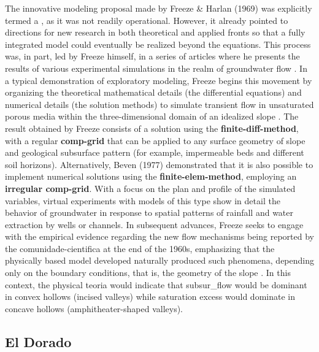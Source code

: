 \documentclass[./main_en.tex]{subfiles}
\begin{document}
\par The innovative modeling proposal made by Freeze \& Harlan (1969) was explicitly termed a , as it was not readily operational. However, it already pointed to directions for new research in both theoretical and applied fronts so that a fully integrated \gls{model} could eventually be realized beyond the equations. This process was, in part, led by Freeze himself, in a series of articles where he presents the results of various experimental simulations in the realm of groundwater flow \cite{Freeze1974a}. In a typical demonstration of exploratory modeling, Freeze begins this movement by organizing the theoretical mathematical details (the differential equations) and numerical details (the solution methods) to simulate transient flow in unsaturated porous media within the three-dimensional domain of an idealized slope \cite{Freeze1971a}. The result obtained by Freeze consists of a solution using the \textbf{\gls{finite-diff-method}}, with a regular \textbf{\gls{comp-grid}} that can be applied to any surface geometry of slope and geological subsurface pattern (for example, impermeable beds and different soil horizons). Alternatively, Beven (1977) \cite{Beven1977a} demonstrated that it is also possible to implement numerical solutions using the \textbf{\gls{finite-elem-method}}, employing an \textbf{irregular \gls{comp-grid}}. With a focus on the plan and profile of the simulated variables, virtual experiments with models of this type show in detail the behavior of groundwater in response to spatial patterns of rainfall and water extraction by wells or channels. In subsequent advances, Freeze seeks to engage with the empirical evidence regarding the new flow mechanisms being reported by the \gls{comunidade-cientifica} at the end of the 1960s, emphasizing that the physically based \gls{model} developed naturally produced such phenomena, depending only on the boundary conditions, that is, the geometry of the slope \cite{Freeze1972a, Freeze1972b}. In this context, the physical \gls{teoria} would indicate that \gls{subsur_flow} would be dominant in convex \gls{hollows} (incised valleys) while saturation excess would dominate in concave \gls{hollows} (amphitheater-shaped valleys). 

\subsection{El Dorado} \label{sec:hydro:broken}
\end{document}
